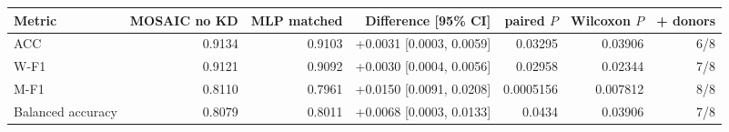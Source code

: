 \begin{tabular}{lrrrrrr}
\toprule
Metric & MOSAIC no KD & MLP matched & Difference [95\% CI] & paired $P$ & Wilcoxon $P$ & + donors \\
\midrule
ACC & 0.9134 & 0.9103 & +0.0031 [0.0003, 0.0059] & 0.03295 & 0.03906 & 6/8 \\
W-F1 & 0.9121 & 0.9092 & +0.0030 [0.0004, 0.0056] & 0.02958 & 0.02344 & 7/8 \\
M-F1 & 0.8110 & 0.7961 & +0.0150 [0.0091, 0.0208] & 0.0005156 & 0.007812 & 8/8 \\
Balanced accuracy & 0.8079 & 0.8011 & +0.0068 [0.0003, 0.0133] & 0.0434 & 0.03906 & 7/8 \\
\bottomrule
\end{tabular}

